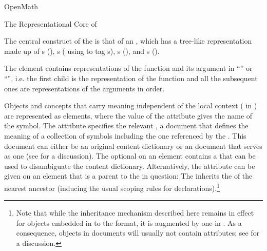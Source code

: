 \begin{omgroup}[id=mobj,short=Mathematical Objects]
\begin{omgroup}[id=openmath]{OpenMath}
\begin{module}[id=OpenMath]
\begin{omgroup}[id=om.core]{The Representational Core of {\openmath}}

\begin{definition}[id=omcore.def]
  The central construct of the {\openmath} is that of an {}, which has a tree-like representation made up of
  {s} ({}), {s}
  ( using  to tag
  {s}), {s} ({}), and
  {s} ({}).
\end{definition}

The  element contains representations of the function and its
argument in ``'' or ``{}'',
i.e. the first child is the representation of the function and all the subsequent ones are
representations of the arguments in order.

\begin{omtext}
Objects and concepts that carry meaning independent of the local context ( in {\openmath}) are represented as
 elements, where the value of the
 attribute gives the name of the symbol.  The
 attribute specifies the relevant {}, a document that defines the meaning of a collection of symbols including
the one referenced by the .  This document can either be an
original {\openmath} content dictionary or an \omdoc document that serves as one (see
{} for a discussion). The optional {} on
an  element contains a {} that can be used to
disambiguate the content dictionary.  Alternatively, the {}
attribute can be given on an {\openmath} element that is a parent to the
 in question: The  inherits the
{} of the nearest ancestor (inducing the usual {\xml} scoping rules
for declarations).\footnote{Note that while the {} inheritance
  mechanism described here remains in effect for {\openmath} objects embedded in to the
  \omdoc format, it is augmented by one in \omdoc. As a consequence, {\openmath}
  objects in \omdoc documents will usually not contain {}
  attributes; see {} for a discussion.}
\end{omtext}


\end{omgroup}
\end{module}
\end{omgroup}
\end{omgroup}
